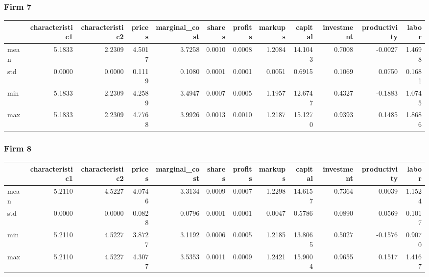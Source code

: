  \subsubsection*{Firm 7}
\begin{tabular}{lrrrrrrrrrrr}
\toprule
{} &  characteristic1 &  characteristic2 &  prices &  marginal\_cost &  shares &  profits &  markups &  capital &  investment &  productivity &  labor \\
\midrule
mean &           5.1833 &           2.2309 &  4.5017 &         3.7258 &  0.0010 &   0.0008 &   1.2084 &  14.1043 &      0.7008 &       -0.0027 & 1.4698 \\
std  &           0.0000 &           0.0000 &  0.1119 &         0.1080 &  0.0001 &   0.0001 &   0.0051 &   0.6915 &      0.1069 &        0.0750 & 0.1681 \\
min  &           5.1833 &           2.2309 &  4.2589 &         3.4947 &  0.0007 &   0.0005 &   1.1957 &  12.6747 &      0.4327 &       -0.1883 & 1.0745 \\
max  &           5.1833 &           2.2309 &  4.7768 &         3.9926 &  0.0013 &   0.0010 &   1.2187 &  15.1270 &      0.9393 &        0.1485 & 1.8686 \\
\bottomrule
\end{tabular}


 \subsubsection*{Firm 8}
\begin{tabular}{lrrrrrrrrrrr}
\toprule
{} &  characteristic1 &  characteristic2 &  prices &  marginal\_cost &  shares &  profits &  markups &  capital &  investment &  productivity &  labor \\
\midrule
mean &           5.2110 &           4.5227 &  4.0746 &         3.3134 &  0.0009 &   0.0007 &   1.2298 &  14.6157 &      0.7364 &        0.0039 & 1.1524 \\
std  &           0.0000 &           0.0000 &  0.0828 &         0.0796 &  0.0001 &   0.0001 &   0.0047 &   0.5786 &      0.0890 &        0.0569 & 0.1017 \\
min  &           5.2110 &           4.5227 &  3.8727 &         3.1192 &  0.0006 &   0.0005 &   1.2185 &  13.8065 &      0.5027 &       -0.1576 & 0.9070 \\
max  &           5.2110 &           4.5227 &  4.3077 &         3.5353 &  0.0011 &   0.0009 &   1.2421 &  15.9004 &      0.9655 &        0.1517 & 1.4167 \\
\bottomrule
\end{tabular}


